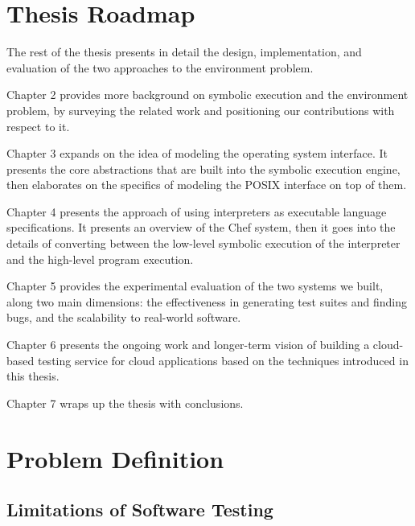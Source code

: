 
\section{Thesis Roadmap}

The rest of the thesis presents in detail the design, implementation, and evaluation of the two approaches to the environment problem.

Chapter 2 provides more background on symbolic execution and the environment problem, by surveying the related work and positioning our contributions with respect to it.

Chapter 3 expands on the idea of modeling the operating system interface.  It presents the core abstractions that are built into the symbolic execution engine, then elaborates on the specifics of modeling the POSIX interface on top of them.

Chapter 4 presents the approach of using interpreters as executable language specifications.  It presents an overview of the Chef system, then it goes into the details of converting between the low-level symbolic execution of the interpreter and the high-level program execution.

Chapter 5 provides the experimental evaluation of the two systems we built, along two main dimensions: the effectiveness in generating test suites and finding bugs, and the scalability to real-world software.

Chapter 6 presents the ongoing work and longer-term vision of building a cloud-based testing service for cloud applications based on the techniques introduced in this thesis.

Chapter 7 wraps up the thesis with conclusions.










\iffalse
\section{Problem Definition}

\subsection{Limitations of Software Testing}

